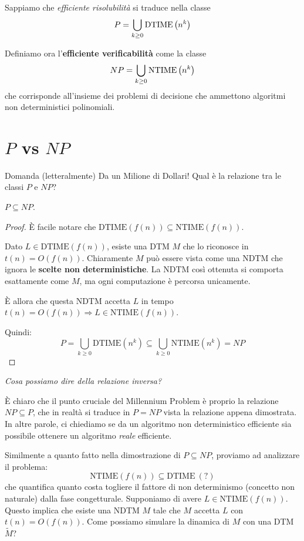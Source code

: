 Sappiamo che \textit{efficiente risolubilità} si traduce nella classe 
$$ P = \bigcup_{k \geq 0} \text{DTIME} \left(n^k\right) $$

Definiamo ora l'\textbf{efficiente verificabilità} come la classe
$$ NP = \bigcup_{k \geq 0} \text{NTIME} \left(n^k\right) $$
che corrisponde all'insieme dei problemi di decisione che ammettono algoritmi non deterministici polinomiali.

\section{$P$ vs $NP$}

Domanda (letteralmente) Da un Milione di Dollari! Qual è la relazione tra le classi $P$ e $NP$? \\

\begin{theor}
$P \subseteq NP$.
\end{theor}

\begin{proof}
È facile notare che $\mathrm{DTIME}(f(n)) \subseteq \mathrm{NTIME}(f(n))$.

Dato $L \in \mathrm{DTIME}(f(n))$, esiste una DTM $M$ che lo riconosce in $t(n) = O(f(n))$. Chiaramente $M$ può essere vista come una NDTM che ignora le \textbf{scelte non deterministiche}. La NDTM così ottenuta si comporta esattamente come $M$, ma ogni computazione è percorsa unicamente. 

È allora che questa NDTM accetta $L$ in tempo $t(n) = O(f(n)) \Rightarrow L \in \mathrm{NTIME}(f(n))$.

Quindi:
\[
P = \bigcup_{k \geq 0} \mathrm{DTIME}(n^k) \subseteq \bigcup_{k \geq 0} \mathrm{NTIME}(n^k) = NP
\]
\end{proof}

\textit{Cosa possiamo dire della relazione inversa?}

È chiaro che il punto cruciale del Millennium Problem è proprio la relazione $NP \subseteq P$, che in realtà si traduce in $P = NP$ vista la relazione appena dimostrata. In altre parole, ci chiediamo se da un algoritmo non deterministico efficiente sia possibile ottenere un algoritmo \emph{reale} efficiente.

Similmente a quanto fatto nella dimostrazione di $P \subseteq NP$, proviamo ad analizzare il problema:
\[
\text{NTIME}(f(n)) \subseteq \text{DTIME} \ (?)
\]
che quantifica quanto costa togliere il fattore di non determinismo (concetto non naturale) dalla fase congetturale. Supponiamo di avere $L \in \text{NTIME}(f(n))$. Questo implica che esiste una NDTM $M$ tale che $M$ accetta $L$ con $t(n) = O(f(n))$. Come possiamo simulare la dinamica di $M$ con una DTM $\widetilde{M}$?


